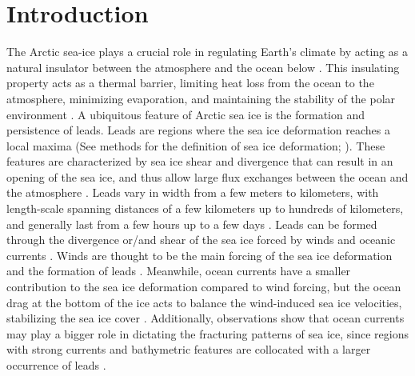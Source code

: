 \documentclass[lineno,sn-basic]{sn-jnl}%
\begin{document}



\maketitle

\section{Introduction}\label{sec1}

The Arctic sea-ice plays a crucial role in regulating Earth's climate by acting as a natural insulator between the atmosphere and the ocean below \citep{Wettlaufer_insulator_1997, Untersteiner_ice_insulator_1961}. This insulating property acts as a thermal barrier, limiting heat loss from the ocean to the atmosphere, minimizing evaporation, and maintaining the stability of the polar environment \citep{Ruffieux_pack_lead_1995}. A ubiquitous feature of Arctic sea ice is the formation and persistence of leads. Leads are regions where the sea ice deformation reaches a local maxima (See methods for the definition of sea ice deformation; \citealt{Hutter_identification_2019}). These features are characterized by sea ice shear and divergence that can result in an opening of the sea ice, and thus allow large flux exchanges between the ocean and the atmosphere \citep{Lupkes_leads_2008}. Leads vary in width from a few meters to kilometers, with length-scale spanning distances of a few kilometers up to hundreds of kilometers, and generally last from a few hours up to a few days \citep{Linow_lkf_2017, Wernecke_Lead_2015, Tschudi_obs_leads_1998}. Leads can be formed through the divergence or/and shear of the sea ice forced by winds and oceanic currents \citep{Rampal_nextsim_2016, Hutchings_model_lkf_2005, Richter_pack_stress_2002}. Winds are thought to be the main forcing of the sea ice deformation and the formation of leads \citep{Linow_lkf_2017, Hutter_scaling_lkf_2018}. Meanwhile, ocean currents have a smaller contribution to the sea ice deformation compared to wind forcing, but the ocean drag at the bottom of the ice acts to balance the wind-induced sea ice velocities, stabilizing the sea ice cover \citep{Weiss_scale_2004}. Additionally, observations show that ocean currents may play a bigger role in dictating the fracturing patterns of sea ice, since regions with strong currents and bathymetric features are collocated with a larger occurrence of leads \citep{Willmes_leads_currents_2023}.
\end{document}
